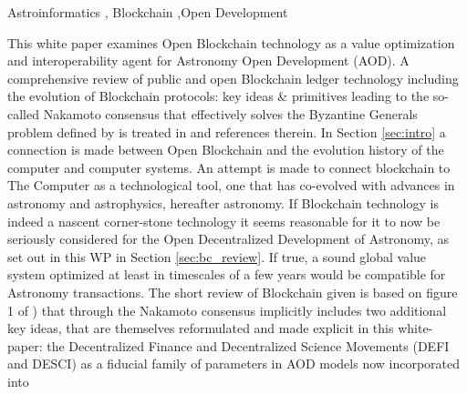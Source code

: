 \documentclass[final,5p,times,twocolumn,authoryear]{elsarticle}
\begin{document}
\begin{frontmatter}



\begin{keyword}
   Astroinformatics \sep 
Blockchain \sep Open Development
\end{keyword}
\end{frontmatter}

This white paper examines Open Blockchain technology as a value optimization and interoperability agent for Astronomy Open Development (AOD). A comprehensive review of public and open Blockchain ledger technology including the evolution of Blockchain protocols: key ideas \& primitives leading to the  so-called Nakamoto consensus that effectively solves the Byzantine Generals problem defined by \cite{Lamport1982TheBG} is treated in  \cite{arvindandclark2017} and references therein. In Section \ref{sec:intro} a connection is made between Open Blockchain and the evolution history of the computer and computer systems. An attempt is made to connect blockchain to The Computer as a technological tool, one that has co-evolved with advances in astronomy and astrophysics, hereafter astronomy. If Blockchain technology is indeed a nascent corner-stone technology it seems reasonable for it to now be seriously considered for the Open Decentralized Development of Astronomy, as set out in this WP in Section \ref{sec:bc_review}. If true, a sound global value system optimized at least in timescales of a few years would be compatible for Astronomy transactions. The short review of Blockchain given is based on figure 1 of \cite{arvindandclark2017}) that through the Nakamoto consensus implicitly includes two additional key ideas, that are themselves reformulated and made explicit in this white-paper: the Decentralized Finance and Decentralized Science Movements (DEFI and DESCI) as a fiducial family of parameters in AOD models now incorporated into 
\end{document}
